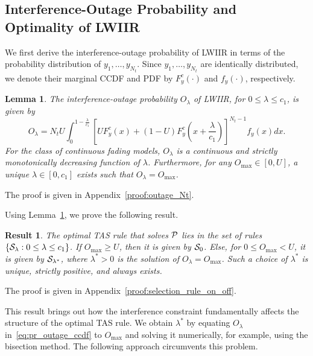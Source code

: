 \documentclass[journal]{IEEEtran}
\newtheorem{lemma}{{\bf Lemma}}
\newtheorem{result}{{\bf Result}}
\newcommand{\set}[1]{\{#1\}}
\newcommand{\lam}{\lambda}
\newcommand{\lamstar}{\lam^{*}}
\newcommand{\Nt}{{N_t}}
\newcommand{\outmax}{O_{\text{max}}}
\newcommand{\cone}{c_{1}}
\newcommand{\out}{O}
\newcommand{\lambycone}{\frac{\lam}{\cone}}
\newcommand{\yk}[1]{y_{#1}}
\newcommand{\un}{U}
\newcommand{\optproblem}{{\cal P}}
\newcommand{\caluncons}{{\cal S_{\text{0}}}}
\newcommand{\callamrule}{{\cal S_{{\lam}}}}
\newcommand{\outlam}{\out_{\lam}}
\newcommand{\callamstarrule}{\cal S_{\lam^{*}}}
\begin{document}
\subsection{Interference-Outage Probability and Optimality of LWIIR} 
\label{sec:out_prob_opt}
We first derive the interference-outage probability of LWIIR in terms of the probability distribution of $\yk{1},\ldots,\yk{\Nt}$. Since $\yk{1},\ldots,\yk{\Nt}$ are identically distributed, we denote their marginal CCDF and PDF by $F_{y}^{c}(\cdot)$ and $f_{y}(\cdot)$, respectively. 
\begin{lemma}
\label{lem:outage_Nt}
The interference-outage probability $\outlam$ of LWIIR, for $0\leq\lam\leq\cone$, is given by
\begin{equation}
\label{eq:pr_outage_ccdf} 
\outlam\!  =\!  \Nt\un\!\!\! \int_{0}^{1-\lambycone}\!\!	
\left[\un\!F_{y}^{c}\!\left(x\right) \!+\! \left(1 \!-\!\un\right)\!F_{y}^{c}\!\left(x\!+\!\lambycone\right)\! \right]^{\!\Nt-1}\!\!\!\! f_{y}(x)dx.
\end{equation}
For the class of continuous fading models, $\outlam$ is a continuous and strictly monotonically decreasing function of $\lam$. Furthermore, for any $\outmax\in[0,\un]$, a unique $\lam\in[0,\cone]$ exists such that $\outlam=\outmax$. 
\end{lemma}
%
\begin{IEEEproof}
The proof is given in Appendix~\ref{proof:outage_Nt}.
\end{IEEEproof}
%

Using Lemma~\ref{lem:outage_Nt}, we prove the following result. 
%
\begin{result}
\label{res:selection_rule_on_off}
The optimal TAS rule that solves $\optproblem$ lies in the set of rules $\set{\callamrule:0\leq\lam\leq\cone}$. If $\outmax\geq\un$, then it is given by $\caluncons$. Else, for $0\leq\outmax<\un$, it is given by $\callamstarrule$, where $\lamstar>0$  is the solution of $\outlam=\outmax$. Such a choice of $\lamstar$ is unique, strictly positive, and always exists. 
\end{result}
%                
\begin{IEEEproof}
   The proof is given in Appendix~\ref{proof:selection_rule_on_off}.
\end{IEEEproof}
%

This result brings out how the interference constraint fundamentally affects the structure of the optimal TAS rule. We obtain $\lamstar$ by equating $\outlam$ in~\eqref{eq:pr_outage_ccdf} to $\outmax$ and solving it numerically, for example, using the bisection method. The following approach circumvents this problem.  
\end{document}
